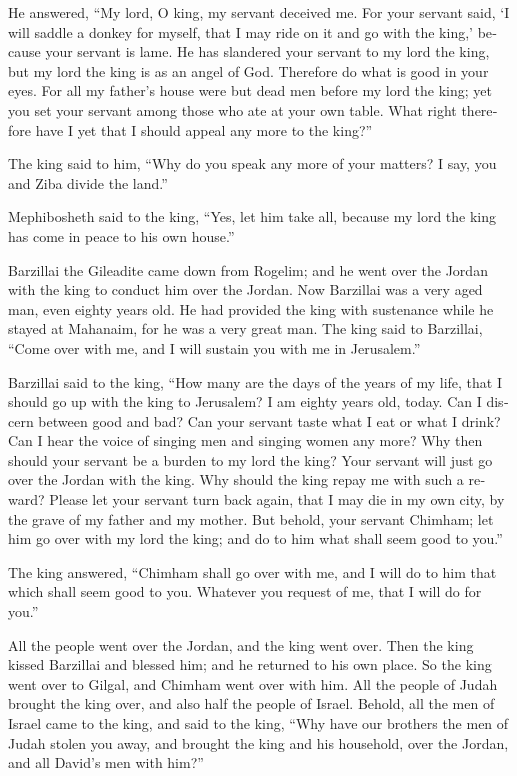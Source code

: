 \begin{paracol}{2}
\begin{otherlanguage}{english}
 He answered, ``My lord, O king, my servant deceived me.
For your servant said, `I will saddle a donkey for myself, that I may
ride on it and go with the king,' because your servant is lame.
 He has slandered your servant to my lord the king, but
my lord the king is as an angel of God. Therefore do what is good in
your eyes.  For all my father's house were but dead men
before my lord the king; yet you set your servant among those who ate at
your own table. What right therefore have I yet that I should appeal any
more to the king?''

 The king said to him, ``Why do you speak any more of
your matters? I say, you and Ziba divide the land.''

 Mephibosheth said to the king, ``Yes, let him take all,
because my lord the king has come in peace to his own house.''

 Barzillai the Gileadite came down from Rogelim; and he
went over the Jordan with the king to conduct him over the Jordan.
 Now Barzillai was a very aged man, even eighty years
old. He had provided the king with sustenance while he stayed at
Mahanaim, for he was a very great man.  The king said to
Barzillai, ``Come over with me, and I will sustain you with me in
Jerusalem.''

 Barzillai said to the king, ``How many are the days of
the years of my life, that I should go up with the king to Jerusalem?
 I am eighty years old, today. Can I discern between good
and bad? Can your servant taste what I eat or what I drink? Can I hear
the voice of singing men and singing women any more? Why then should
your servant be a burden to my lord the king?  Your
servant will just go over the Jordan with the king. Why should the king
repay me with such a reward?  Please let your servant
turn back again, that I may die in my own city, by the grave of my
father and my mother. But behold, your servant Chimham; let him go over
with my lord the king; and do to him what shall seem good to you.''

 The king answered, ``Chimham shall go over with me, and
I will do to him that which shall seem good to you. Whatever you request
of me, that I will do for you.''

 All the people went over the Jordan, and the king went
over. Then the king kissed Barzillai and blessed him; and he returned to
his own place.  So the king went over to Gilgal, and
Chimham went over with him. All the people of Judah brought the king
over, and also half the people of Israel.  Behold, all
the men of Israel came to the king, and said to the king, ``Why have our
brothers the men of Judah stolen you away, and brought the king and his
household, over the Jordan, and all David's men with him?''


\end{otherlanguage}
\end{paracol}
